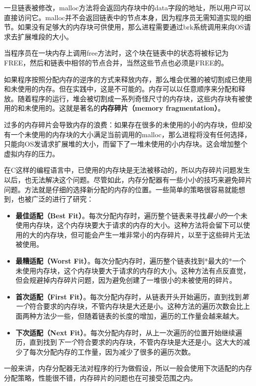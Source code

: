 \documentclass[cn,11pt,chinese]{elegantbook}
\begin{document}
一旦链表被修改，malloc方法将会返回内存块中的data字段的地址，所以用户可以直接访问它。malloc并不会返回链表中的节点本身，因为程序员无需知道实现的细节。如果没有足够大的内存块可供使用，那么进程需要通过brk系统调用来向OS请求去扩展堆段的大小。

当程序员在一块内存上调用free方法时，这个块在链表中的状态将被标记为FREE，然后和链表中相邻的节点合并，当然这些节点也必须是FREE的。

如果程序按照分配内存的逆序的方式来释放内存，那么堆会优雅的被切割成已使用和未使用的内存。但在实践中，这是不可能的。内存可以以任意顺序来分配和释放。随着程序的运行，堆会被切割成一系列奇怪尺寸的内存块，这些内存块有被使用的和未使用的。这就是著名的\textbf{内存碎片（memory fragmentation）}。

过多的内存碎片会导致内存的浪费：如果存在很多的未使用的小的内存块，但却没有一个未使用的内存块的大小满足当前调用的malloc，那么进程将没有任何选择，只能向OS发请求扩展堆的大小，而留下了一堆未使用的小内存块。这会增加整个虚拟内存的压力。

在C这样的编程语言中，已使用的内存块是无法被移动的，所以内存碎片问题发生以后，也无法解决这个问题。尽管如此，内存分配器有一些小小的技巧来避免碎片问题。方法就是仔细的选择新分配的内存的位置。一些简单的策略很容易就能想到，也被广泛的进行了研究：

\begin{itemize}
  \item \textbf{最佳适配（Best Fit）}。每次分配内存时，遍历整个链表来寻找\textit{最小的}一个未使用内存块，这个内存块要大于请求的内存的大小。这种方法将会留下可以使用的大的内存块，但可能会产生一堆非常小的内存碎片，以至于这些碎片无法被使用。
  \item \textbf{最糟适配（Worst Fit）}。每次分配内存时，遍历整个链表找到*最大的*一个未使用内存块，这个内存块要大于请求的内存的大小。这种方法有点反直觉，但会规避掉内存碎片问题，因为避免创建了一堆很小的未被使用的碎片。
  \item \textbf{首次适配（First Fit）}。每次分配内存时，从链表开头开始遍历，直到找到\textit{第一个}符合要求的内存块，不管内存块是大还是小。这种方法的遍历次数会比上面两种方法少一些，但随着链表的长度的增加，遍历的工作量会越来越大。
  \item \textbf{下次适配（Next Fit）}。每次分配内存时，从上一次遍历的位置开始继续遍历，直到找到\textit{下一个}符合要求的内存块，不管内存块是大还是小。这大大的减少了每次分配内存的工作量，因为减少了很多的遍历次数。
\end{itemize}

一般来讲，内存分配器无法对程序的行为做假设，所以一般会使用下次适配的内存分配策略，性能很不错，内存碎片的问题也在可接受范围之内。
\end{document}
